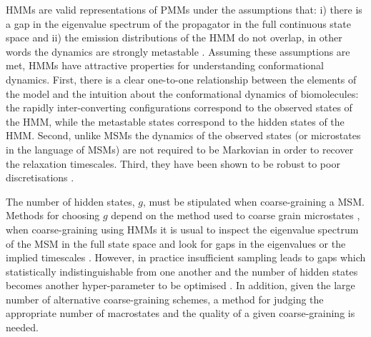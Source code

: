 HMMs are valid representations of PMMs under the assumptions that: i) there is a gap in the eigenvalue spectrum of the propagator in the full continuous state space and ii) the emission distributions of the HMM do not overlap, in other words the dynamics are strongly metastable \cite{noeProjectedHiddenMarkov2013a}. Assuming these assumptions are met, HMMs have attractive properties for understanding conformational dynamics.  First, there is a clear one-to-one relationship between the elements of the model and the intuition about the conformational dynamics of biomolecules: the rapidly inter-converting configurations correspond to the observed states of the HMM, while the metastable states correspond to the hidden states of the HMM. Second, unlike MSMs the dynamics of the observed states (or microstates in the language of MSMs) are not required to be Markovian in order to recover the relaxation timescales. Third, they have been shown to be robust to poor discretisations \cite{noeProjectedHiddenMarkov2013a}. 

The number of hidden states, $g$, must be stipulated when coarse-graining a MSM. Methods for choosing $g$  depend on the method used to coarse grain microstates \cite{bowmanQuantitativeComparisonAlternative2013}, when coarse-graining using HMMs  it is usual to inspect the eigenvalue spectrum of the MSM in the full state space and look for gaps in the eigenvalues or the implied timescales \cite{noeProjectedHiddenMarkov2013a}. However, in practice insufficient sampling leads to gaps which statistically indistinguishable from one another and the number of hidden states becomes another hyper-parameter to be optimised \cite{bowmanQuantitativeComparisonAlternative2013}. In addition, given the large number of alternative coarse-graining schemes, a method for judging the appropriate number of macrostates and the quality of a given coarse-graining  is needed. 

